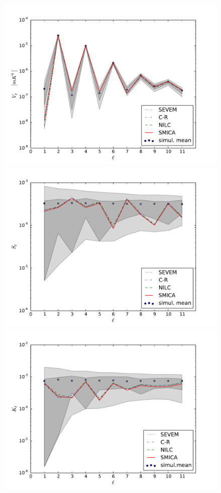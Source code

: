 \begin{figure}
\centering
\includegraphics[scale=0.3]{figures/chapter-vsk/Vl_u73.pdf}
\includegraphics[scale=0.3]{figures/chapter-vsk/Sl_u73.pdf}\\
\includegraphics[scale=0.3]{figures/chapter-vsk/Kl_u73.pdf}

\end{figure}
